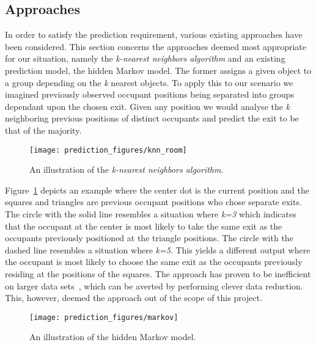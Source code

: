 \subsection{Approaches}
\label{pred_appr}
In order to satisfy the prediction requirement, various existing approaches have been considered. This section concerns the approaches deemed most appropriate for our situation, namely the \emph{k-nearest neighbors algorithm} and an existing prediction model, the hidden Markov model. The former assigns a given object to a group depending on the \emph{k} nearest objects. To apply this to our scenario we imagined previously observed occupant positions being separated into groups dependant upon the chosen exit. Given any position we would analyse the \emph{k} neighboring previous positions of distinct occupants and predict the exit to be that of the majority.
\begin{figure}
\centering
\texttt{[image: prediction\_figures/knn\_room]}
\caption{An illustration of the \emph{k-nearest neighbors algorithm}.}
\label{fig:knn}
\end{figure}
Figure~\ref{fig:knn} depicts an example where the center dot is the current position and the squares and triangles are previous occupant positions who chose separate exits. The circle with the solid line resembles a situation where \emph{k=3} which indicates that the occupant at the center is most likely to take the same exit as the occupants previously positioned at the triangle positions. The circle with the dashed line resembles a situation where \emph{k=5}. This yields a different output where the occupant is most likely to choose the same exit as the occupants previously residing at the positions of the squares. The approach has proven to be inefficient on larger data sets~\cite{bhatia}, which can be averted by performing clever data reduction. This, however, deemed the approach out of the scope of this project. \\
\begin{figure}
\centering
\texttt{[image: prediction\_figures/markov]}
\caption{An illustration of the hidden Markov model.}
\label{fig:markov}
\end{figure}
